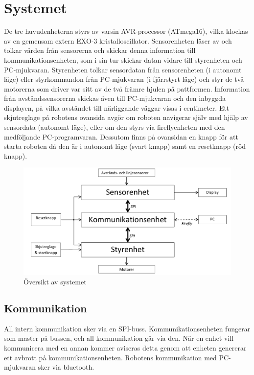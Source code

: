 %

\section{Systemet}

De tre huvudenheterna styrs av varsin AVR-processor (ATmega16), vilka klockas 
av en gemensam extern EXO-3 kristalloscillator. Sensorenheten läser av och 
tolkar värden från sensorerna och skickar denna information till 
kommunikationsenheten, som i sin tur skickar datan vidare till styrenheten 
och PC-mjukvaran. Styrenheten tolkar sensordatan från 
sensorenheten (i autonomt läge) eller styrkommandon från PC-mjukvaran 
(i fjärrstyrt läge) och styr de två motorerna som driver var sitt av de två 
främre hjulen på pattformen. Information från avståndssensorerna skickas även
till PC-mjukvaran och den inbyggda displayen, på vilka avståndet till 
närliggande väggar visas i centimeter.  Ett skjutreglage på robotens ovansida 
avgör om roboten navigerar själv med hjälp av sensordata (autonomt läge), 
eller om den styrs via fireflyenheten med den medföljande PC-programvaran. 
Dessutom finns på ovansidan en knapp för att starta roboten då den är i autonomt läge 
(svart knapp) samt en resetknapp (röd knapp).

\begin{figure}[H]
 \centering
 \includegraphics[angle=0,scale=0.8]{bilder/systemoversikt.pdf}
  \caption{Översikt av systemet}
  \label{fig:system}
\end{figure}


\subsection{Kommunikation}
All intern kommunikation sker via en SPI-buss. Kommunikationsenheten fungerar som master på bussen, och all kommunikation går via den. När en enhet vill kommunicera med en annan kommer aviseras detta genom att enheten genererar ett avbrott på kommunikationsenheten. 
Robotens kommunikation med PC-mjukvaran sker via bluetooth.
